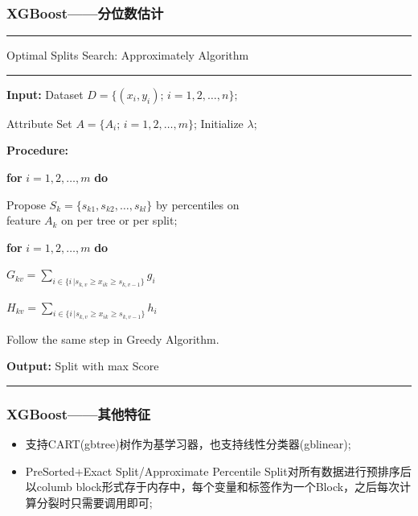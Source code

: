 \documentclass[usenames,dvipsnames]{beamer}
\begin{document}
\begin{frame}
\frametitle{XGBoost——分位数估计}
\noindent\rule[0.10\baselineskip]{\textwidth}{0.75pt}\par
Optimal Splits Search: Approximately Algorithm\\
\noindent\rule[0.10\baselineskip]{\textwidth}{0.5pt}
    \textbf{Input:} Dataset $D=\{(x_i,y_i);\, i = 1,2,\dots, n\};$\par
    \hspace*{32pt} Attribute Set $A = \{A_i;\,i=1,2,\dots,m\}$; Initialize $\lambda$;\par
    \textbf{Procedure:}\par
    \hspace*{32pt} \textbf{for} $i = 1,2,\dots, m$ \textbf{do}\par
    \hspace*{48pt}  Propose $S_k = \{s_{k1},s_{k2},\dots,s_{kl}\}$ by percentiles on \\ \hspace*{48pt}feature $A_k$ on per tree or per split;\par
    \hspace*{32pt}  \textbf{for} $i = 1,2,\dots, m$ \textbf{do}\par
    \hspace*{48pt}  $G_{kv} = \sum_{i \in \{i\,|s_{k,v}\geq x_{ik}\geq s_{k,v-1}\}}g_i$\par
    \hspace*{48pt}  $H_{kv} = \sum_{i \in \{i\,|s_{k,v}\geq x_{ik}\geq s_{k,v-1}\}}h_i$\par
    \hspace*{32pt}  Follow the same step in Greedy Algorithm.\par  
    \textbf{Output:} Split with max Score\\
\noindent\rule[0.10\baselineskip]{\textwidth}{0.75pt}\par
\end{frame}
\begin{frame}
\frametitle{XGBoost——其他特征}
\begin{itemize}
  \item 支持CART(gbtree)树作为基学习器，也支持线性分类器(gblinear);
  \item PreSorted+Exact Split\slash Approximate Percentile Split对所有数据进行预排序后以columb block形式存于内存中，每个变量和标签作为一个Block，之后每次计算分裂时只需要调用即可;
\end{itemize}
\end{frame}
\end{document}
